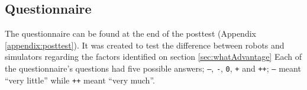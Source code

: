 \subsection*{Questionnaire}
The questionnaire can be found at the end of the posttest (Appendix \ref{appendix:posttest}). It was created to test the difference between robots and simulators regarding the factors identified on section \ref{sec:whatAdvantage} Each of the questionnaire's questions had five possible answers; \texttt{--}, \texttt{-}, \texttt{0}, \texttt{+} and \texttt{++}; \texttt{--} meant ``very little'' while \texttt{++} meant ``very much''.